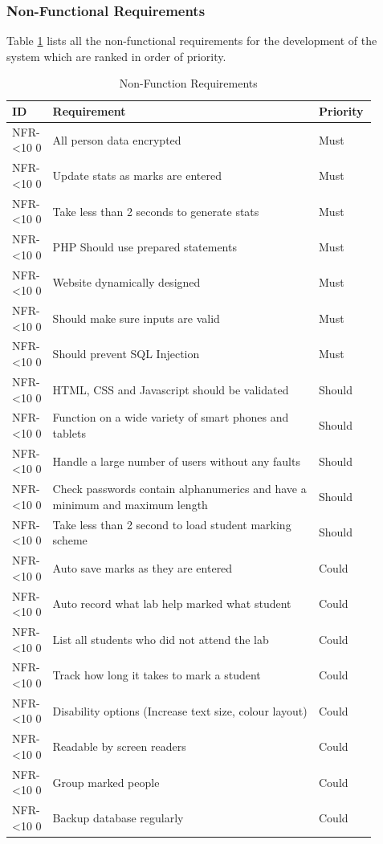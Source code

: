 \documentclass[12pt]{article}  %
\newcommand{\rid}[1]{\centering #1-\ifnum\value{requirement}<10 0\fi\arabic{requirement}
\stepcounter{requirement}}
\begin{document}
\newpage
\subsubsection{Non-Functional Requirements} \label{sec:non-func}

Table \ref{table:non-func} lists all the non-functional requirements for the development of the system which are ranked in order of priority.

\begin{spacing}{1.5}
\begin{longtable}{|p{0.1\linewidth}|p{0.7\linewidth}|p{0.1\linewidth}|}
\caption{Non-Function Requirements} \label{table:non-func}\\
\hline
\textbf{ID} & \textbf{Requirement} & \textbf{Priority}\\
\hline \hline


\rid{NFR} & All person data encrypted & Must\\ \hline
\rid{NFR} & Update stats as marks are entered & Must\\ \hline
\rid{NFR} & Take less than 2 seconds to generate stats  & Must\\ \hline
\rid{NFR} & PHP Should use prepared statements & Must\\ \hline
\rid{NFR} & Website dynamically designed & Must\\ \hline
\rid{NFR} & Should make sure inputs are valid & Must\\ \hline
\rid{NFR} & Should prevent SQL Injection & Must\\ \hline


\rid{NFR} & HTML, CSS and Javascript should be validated & Should\\ \hline
\rid{NFR} & Function on a wide variety of smart phones and tablets & Should\\ \hline
\rid{NFR} & Handle a large number of users without any faults & Should\\ \hline
\rid{NFR} & Check passwords contain alphanumerics and have a minimum and maximum length  & Should\\ \hline
\rid{NFR} & Take less than 2 second to load student marking scheme & Should\\ \hline


\rid{NFR} & Auto save marks as they are entered & Could\\ \hline
\rid{NFR} & Auto record what lab help marked what student & Could\\ \hline
\rid{NFR} & List all students who did not attend the lab & Could\\ \hline
\rid{NFR} & Track how long it takes to mark a student & Could \\ \hline
\rid{NFR} & Disability options (Increase text size, colour layout) & Could\\ \hline
\rid{NFR} & Readable by screen readers & Could\\ \hline
\rid{NFR} & Group marked people & Could \\ \hline
\rid{NFR} & Backup database regularly & Could\\ \hline



\end{longtable}
\end{spacing}
\end{document}
